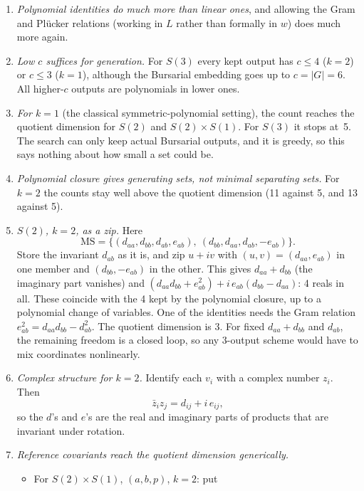 \documentclass[11pt]{article}
\theoremstyle{definition}
\theoremstyle{remark}
\newcommand{\MS}{\mathrm{MS}}
\begin{document}
\begin{enumerate}
  \item \emph{Polynomial identities do much more than linear ones}, and allowing
    the Gram and Plücker relations (working in $L$ rather than formally in $w$)
    does much more again.
  \item \emph{Low $c$ suffices for generation.} For $S(3)$ every kept output has
    $c \le 4$ ($k = 2$) or $c \le 3$ ($k = 1$), although the Bursarial
    embedding goes up to $c = |G| = 6$. All higher-$c$ outputs are polynomials
    in lower ones.
  \item \emph{For $k = 1$} (the classical symmetric-polynomial setting), the
    count reaches the quotient dimension for $S(2)$ and $S(2) \times S(1)$.
    For $S(3)$ it stops at~5. The search can only keep actual Bursarial outputs,
    and it is greedy, so this says nothing about how small a set could be.
  \item \emph{Polynomial closure gives generating sets, not minimal separating
    sets.} For $k = 2$ the counts stay well above the quotient dimension (11
    against 5, and 13 against 5).
  \item \emph{$S(2)$, $k = 2$, as a zip.} Here
    \[
      \MS = \{(d_{aa}, d_{bb}, d_{ab}, e_{ab}),\ (d_{bb}, d_{aa}, d_{ab}, -e_{ab})\}.
    \]
    Store the invariant $d_{ab}$ as it is, and zip $u + iv$ with
    $(u, v) = (d_{aa}, e_{ab})$ in one member and $(d_{bb}, -e_{ab})$ in the
    other. This gives
    $d_{aa} + d_{bb}$ (the imaginary part vanishes) and
    $(d_{aa} d_{bb} + e_{ab}^2) + i\, e_{ab}(d_{bb} - d_{aa})$: 4 reals in all.
    These coincide with the 4 kept by the polynomial closure, up to a
    polynomial change of variables. One of the identities needs the Gram
    relation $e_{ab}^2 = d_{aa}d_{bb} - d_{ab}^2$. The quotient dimension is
    3. For fixed $d_{aa} + d_{bb}$ and $d_{ab}$, the remaining freedom is a
    closed loop, so any 3-output scheme would have to mix coordinates
    nonlinearly.
  \item \emph{Complex structure for $k = 2$.} Identify each $v_i$ with a complex
    number $z_i$. Then
    \[
      \bar z_i z_j = d_{ij} + i\, e_{ij},
    \]
    so the $d$'s and $e$'s are the real and imaginary parts of products that
    are invariant under rotation.
  \item \emph{Reference covariants reach the quotient dimension generically.}
    \begin{itemize}
      \item For $S(2) \times S(1)$, $(a, b, p)$, $k = 2$: put

\end{itemize}
\end{enumerate}
\end{document}
